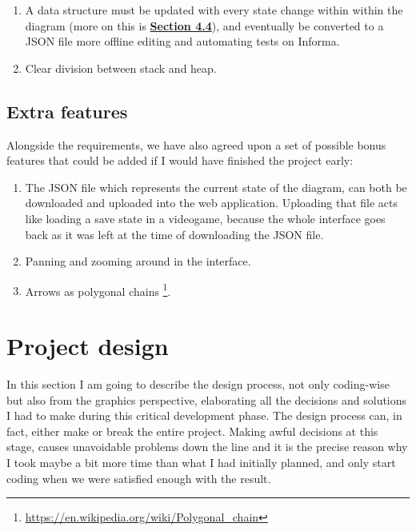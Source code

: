 \documentclass[]{usiinfbachelorproject}
\begin{document}
\begin{enumerate}
	\item A data structure must be updated with every state change within within the diagram (more on this is \hyperref[storing states]{\textbf{Section 4.4}}), and eventually be converted to a JSON file more offline editing and automating tests on Informa.
	\item Clear division between stack and heap.
\end{enumerate}

\subsection{Extra features}

Alongside the requirements, we have also agreed upon a set of possible bonus features that could be added if I would have finished the project early:

\begin{enumerate}
	\item The JSON file which represents the current state of the diagram, can both be downloaded and uploaded into the web application. Uploading that file acts like loading a save state in a videogame, because the whole interface goes back as it was left at the time of downloading the JSON file.
	\item Panning and zooming around in the interface.
	\item Arrows as polygonal chains \footnote{\url{https://en.wikipedia.org/wiki/Polygonal_chain}}.
\end{enumerate}

\vspace{\fill}

\pagebreak

\section{Project design} \label{design}

In this section I am going to describe the design process, not only coding-wise but also from the graphics perspective, elaborating all the decisions and solutions I had to make during this critical development phase. The design process can, in fact, either make or break the entire project. Making awful decisions at this stage, causes unavoidable problems down the line and it is the precise reason why I took maybe a bit more time than what I had initially planned, and only start coding when we were satisfied enough with the result.
\end{document}
